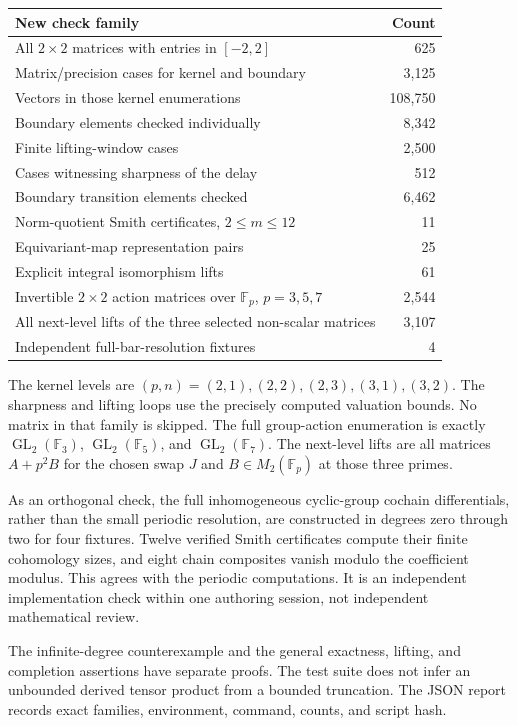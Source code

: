 \documentclass[11pt]{article}
\theoremstyle{definition}
\theoremstyle{remark}
\begin{document}
\begin{center}
\begin{tabular}{lr}
\toprule
New check family & Count\\
\midrule
All $2\times2$ matrices with entries in $[-2,2]$ & 625\\
Matrix/precision cases for kernel and boundary & 3,125\\
Vectors in those kernel enumerations & 108,750\\
Boundary elements checked individually & 8,342\\
Finite lifting-window cases & 2,500\\
Cases witnessing sharpness of the delay & 512\\
Boundary transition elements checked & 6,462\\
Norm-quotient Smith certificates, $2\leq m\leq12$ & 11\\
Equivariant-map representation pairs & 25\\
Explicit integral isomorphism lifts & 61\\
Invertible $2\times2$ action matrices over $\mathbb F_p$, $p=3,5,7$ & 2,544\\
All next-level lifts of the three selected non-scalar matrices & 3,107\\
Independent full-bar-resolution fixtures & 4\\
\bottomrule
\end{tabular}
\end{center}

The kernel levels are $(p,n)=(2,1),(2,2),(2,3),(3,1),(3,2)$. The sharpness and lifting loops use the precisely computed valuation bounds. No matrix in that family is skipped. The full group-action enumeration is exactly $\operatorname{GL}_2(\mathbb F_3)$, $\operatorname{GL}_2(\mathbb F_5)$, and $\operatorname{GL}_2(\mathbb F_7)$. The next-level lifts are all matrices $A+p^2B$ for the chosen swap $J$ and $B\in M_2(\mathbb F_p)$ at those three primes.

As an orthogonal check, the full inhomogeneous cyclic-group cochain differentials, rather than the small periodic resolution, are constructed in degrees zero through two for four fixtures. Twelve verified Smith certificates compute their finite cohomology sizes, and eight chain composites vanish modulo the coefficient modulus. This agrees with the periodic computations. It is an independent implementation check within one authoring session, not independent mathematical review.

The infinite-degree counterexample and the general exactness, lifting, and completion assertions have separate proofs. The test suite does not infer an unbounded derived tensor product from a bounded truncation. The JSON report records exact families, environment, command, counts, and script hash.
\end{document}
